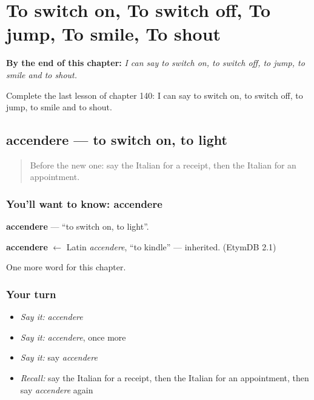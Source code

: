 
\chapter{To switch on, To switch off, To jump, To smile, To shout}
\label{ch:it-to-switch-on-to-switch-off-to-jump-to-smile-to-shout}

\begin{chapteropening}
\textbf{By the end of this chapter:} \emph{I can say to switch on, to switch off, to jump, to smile and to shout.}

Complete the last lesson of chapter 140: I can say to switch on, to switch off, to jump, to smile and to shout.
\end{chapteropening}

\section[accendere]{accendere — to switch on, to light}

\label{lesson:IT-C140-accendere}



\begin{quote}
Before the new one: say the Italian for a receipt, then the Italian for an appointment.
\end{quote}

\subsection*{You'll want to know: accendere}
\textbf{accendere} — \textquotedblleft{}to switch on, to light\textquotedblright{}.

\begin{cousinweb}
\textbf{accendere} $\leftarrow$ Latin \emph{accendere}, \textquotedblleft{}to kindle\textquotedblright{} — inherited. (EtymDB 2.1)
\end{cousinweb}

\begin{grammarlens}[title={What you've built}]
One more word for this chapter.
\end{grammarlens}

\subsection*{Your turn}
\begin{itemize}
\raggedright
  \item \emph{Say it:} \emph{accendere}
  \item \emph{Say it:} \emph{accendere}, once more
  \item \emph{Say it:} say \emph{accendere}
  \item \emph{Recall:} say the Italian for a receipt, then the Italian for an appointment, then say \emph{accendere} again
\end{itemize}

